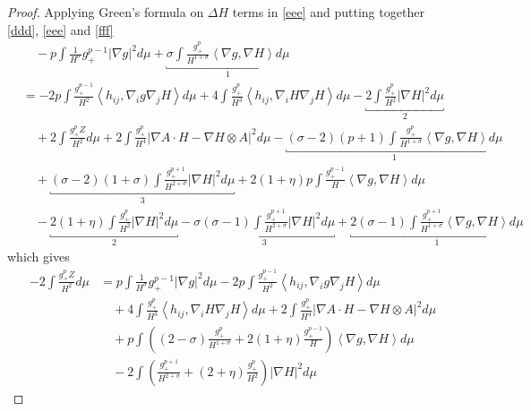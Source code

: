 \begin{proof}
    Applying Green's formula on $ \Delta H $ terms in \cref{eee} and putting together \cref{ddd}, \cref{eee} and \cref{fff} 
    \begin{align*}
        & \quad -p \int \frac{1}{H^{\sigma}}g_{+}^{p-1}|\nabla g|^{2}d \mu+ \underbracket{\sigma \int \frac{g_{+}^{p}}{H^{1+\sigma}}\left<  \nabla g,\nabla H \right>d \mu}_{1} \\
        & = -2p \int \frac{g_{+}^{p-1}}{H^{2}} \left< h_{ij}, \nabla_{i}g \nabla_{j}H \right>d \mu + 4 \int \frac{g_{+}^{p}}{H^{3}} \left<  h_{ij}, \nabla_{i}H\nabla_{j}H  \right>d \mu -\underbracket{2 \int \frac{g_{+}^{p}}{H^{2}}|\nabla H|^{2}d \mu}_{2}  \\
        & \quad + 2 \int \frac{g_{+}^{p}Z}{H^{2}}d \mu + 2 \int \frac{g_{+}^{p}}{H^{4}}| \nabla A \cdot H - \nabla H \otimes A|^{2}d \mu - \underbracket{(\sigma -2 )(p+1)\int \frac{g_{+}^{p}}{H^{1+\sigma}} \left< \nabla g, \nabla H \right> d \mu}_{1} \\
        & \quad + \underbracket{(\sigma-2)(1+\sigma) \int \frac{g_{+}^{p+1}}{H^{2+\sigma}}|\nabla H|^{2} d \mu}_{3}  + 2(1+\eta)p \int \frac{g_{+}^{p-1}}{H}\left< \nabla g , \nabla H\right>d \mu \\
        & \quad -\underbracket{2(1+\eta) \int \frac{g_{+}^{p}}{H^{2}}| \nabla H|^{2} d \mu}_{2} - \underbracket{\sigma(\sigma-1)\int \frac{g_{+}^{p+1}}{H^{2+\sigma}}|\nabla H|^{2}d \mu}_{3} + \underbracket{2(\sigma -1) \int \frac{g_{+}^{p+1}}{H^{1+\sigma}}\left< \nabla g, \nabla H \right>d \mu}_{1}
    \end{align*}
    which gives \begin{align}
        -2 \int \frac{g_{+}^{p}Z}{H^{2}}d \mu & = p \int \frac{1}{H^{\sigma}}g_{+}^{p-1}|\nabla g|^{2}d \mu-2p \int \frac{g_{+}^{p-1}}{H^{2}} \left< h_{ij}, \nabla_{i}g \nabla_{j}H \right>d \mu \nonumber\\
        & \quad + 4 \int \frac{g_{+}^{p}}{H^{3}} \left<  h_{ij}, \nabla_{i}H\nabla_{j}H  \right>d \mu + 2 \int \frac{g_{+}^{p}}{H^{4}}| \nabla A \cdot H - \nabla H \otimes A|^{2}d \mu \nonumber \\
        & \quad + p \int \left( (2-\sigma) \frac{g_{+}^{p}}{H^{1+\sigma}}+ 2(1+\eta) \frac{g_{+}^{p-1}}{H} \right)\left< \nabla g, \nabla H \right>d \mu \nonumber \\
        & \quad -2 \int \left( \frac{g_{+}^{p+1}}{H^{2+\sigma}}+ (2+\eta) \frac{g_{+}^{p}}{H^{2}} \right) | \nabla H|^{2}d \mu \label{ggg}
    \end{align}


\end{proof}
